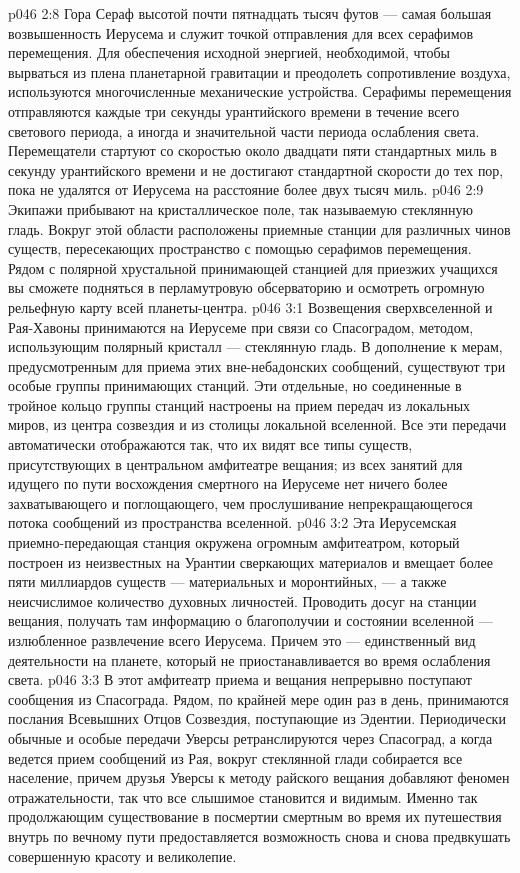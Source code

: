 \vs p046 2:8 \pc Гора Сераф высотой почти пятнадцать тысяч футов --- самая большая возвышенность Иерусема и служит точкой отправления для всех серафимов перемещения. Для обеспечения исходной энергией, необходимой, чтобы вырваться из плена планетарной гравитации и преодолеть сопротивление воздуха, используются многочисленные механические устройства. Серафимы перемещения отправляются каждые три секунды урантийского времени в течение всего светового периода, а иногда и значительной части периода ослабления света. Перемещатели стартуют со скоростью около двадцати пяти стандартных миль в секунду урантийского времени и не достигают стандартной скорости до тех пор, пока не удалятся от Иерусема на расстояние более двух тысяч миль.
\vs p046 2:9 Экипажи прибывают на кристаллическое поле, так называемую стеклянную гладь. Вокруг этой области расположены приемные станции для различных чинов существ, пересекающих пространство с помощью серафимов перемещения. Рядом с полярной хрустальной принимающей станцией для приезжих учащихся вы сможете подняться в перламутровую обсерваторию и осмотреть огромную рельефную карту всей планеты\hyp{}центра.
\vs p046 3:1 Возвещения сверхвселенной и Рая\hyp{}Хавоны принимаются на Иерусеме при связи со Спасоградом, методом, использующим полярный кристалл --- стеклянную гладь. В дополнение к мерам, предусмотренным для приема этих вне\hyp{}небадонских сообщений, существуют три особые группы принимающих станций. Эти отдельные, но соединенные в тройное кольцо группы станций настроены на прием передач из локальных миров, из центра созвездия и из столицы локальной вселенной. Все эти передачи автоматически отображаются так, что их видят все типы существ, присутствующих в центральном амфитеатре вещания; из всех занятий для идущего по пути восхождения смертного на Иерусеме нет ничего более захватывающего и поглощающего, чем прослушивание непрекращающегося потока сообщений из пространства вселенной.
\vs p046 3:2 Эта Иерусемская приемно\hyp{}передающая станция окружена огромным амфитеатром, который построен из неизвестных на Урантии сверкающих материалов и вмещает более пяти миллиардов существ --- материальных и моронтийных, --- а также неисчислимое количество духовных личностей. Проводить досуг на станции вещания, получать там информацию о благополучии и состоянии вселенной --- излюбленное развлечение всего Иерусема. Причем это --- единственный вид деятельности на планете, который не приостанавливается во время ослабления света.
\vs p046 3:3 В этот амфитеатр приема и вещания непрерывно поступают сообщения из Спасограда. Рядом, по крайней мере один раз в день, принимаются послания Всевышних Отцов Созвездия, поступающие из Эдентии. Периодически обычные и особые передачи Уверсы ретранслируются через Спасоград, а когда ведется прием сообщений из Рая, вокруг стеклянной глади собирается все население, причем друзья Уверсы к методу райского вещания добавляют феномен отражательности, так что все слышимое становится и видимым. Именно так продолжающим существование в посмертии смертным во время их путешествия внутрь по вечному пути предоставляется возможность снова и снова предвкушать совершенную красоту и великолепие.
